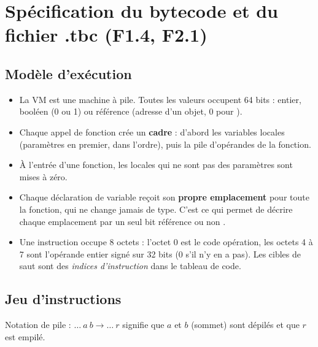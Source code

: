 \documentclass[11pt,a4paper]{article}
\newcommand{\code}[1]{\texttt{\detokenize{#1}}}
\begin{document}
\section{Spécification du bytecode et du fichier .tbc (F1.4, F2.1)}

\subsection{Modèle d'exécution}
\begin{itemize}
  \item La VM est une machine à pile. Toutes les valeurs occupent 64 bits : entier, booléen (0 ou 1) ou référence (adresse d'un objet, 0 pour \code{null}).
  \item Chaque appel de fonction crée un \textbf{cadre} : d'abord les variables locales (paramètres en premier, dans l'ordre), puis la pile d'opérandes de la fonction.
  \item À l'entrée d'une fonction, les locales qui ne sont pas des paramètres sont mises à zéro.
  \item Chaque déclaration de variable reçoit son \textbf{propre emplacement} pour toute la fonction, qui ne change jamais de type. C'est ce qui permet de décrire chaque emplacement par un seul bit \og référence ou non \fg{}.
  \item Une instruction occupe 8 octets : l'octet 0 est le code opération, les octets 4 à 7 sont l'opérande entier signé sur 32 bits (0 s'il n'y en a pas). Les cibles de saut sont des \emph{indices d'instruction} dans le tableau de code.
\end{itemize}

\subsection{Jeu d'instructions}

Notation de pile : $\ldots\ a\ b \rightarrow \ldots\ r$ signifie que $a$ et $b$ (sommet) sont dépilés et que $r$ est empilé.
\end{document}
